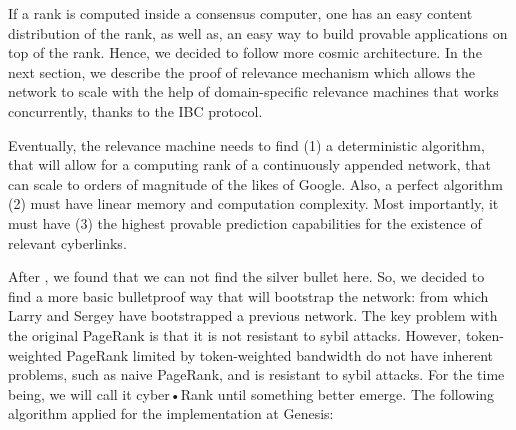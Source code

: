 \documentclass[8pt,oneside]{amsart}
\newcommand{\linkred}[2]{\href{#1}{\color{red}{#2}}}
\begin{document}
If a rank is computed inside a consensus computer, one has an easy content distribution of the rank, as well as, an easy way to build provable applications on top of the rank. Hence, we decided to follow more cosmic architecture. In the next section, we describe the proof of relevance mechanism which allows the network to scale with the help of domain-specific relevance machines that works concurrently, thanks to the IBC protocol.

Eventually, the relevance machine needs to find (1) a deterministic algorithm, that will allow for a computing rank of a continuously appended network, that can scale to orders of magnitude of the likes of Google. Also, a perfect algorithm (2) must have linear memory and computation complexity. Most importantly, it must have (3) the highest provable prediction capabilities for the existence of relevant cyberlinks.

After \linkred{https://arxiv.org/pdf/1709.09002.pdf}{some research}, we found that we can not find the silver bullet here. So, we decided to find a more basic bulletproof way that will bootstrap the network: \linkred{http://ilpubs.stanford.edu:8090/422/1/1999-66.pdf}{the rank} from which Larry and Sergey have bootstrapped a previous network. The key problem with the original PageRank is that it is not resistant to sybil attacks. However, token-weighted PageRank limited by token-weighted bandwidth do not have inherent problems, such as naive PageRank, and is resistant to sybil attacks. For the time being, we will call it cyber•Rank until something better emerge. The following algorithm applied for the implementation at Genesis:
\end{document}
